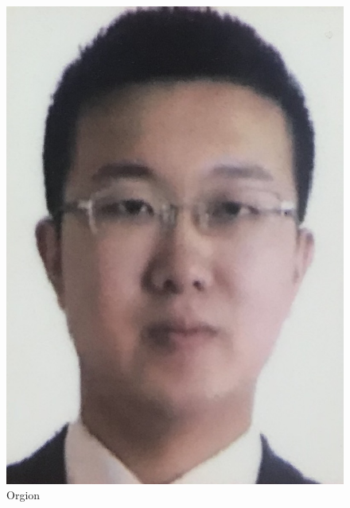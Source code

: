 \documentclass[titlepage]{article}
\begin{document}
\begin{figure}[htbp]
\centering
\includegraphics[width=.9\linewidth]{./img/photo.jpg}
\caption{\label{fig:label}Orgion}
\end{figure}
\end{document}
